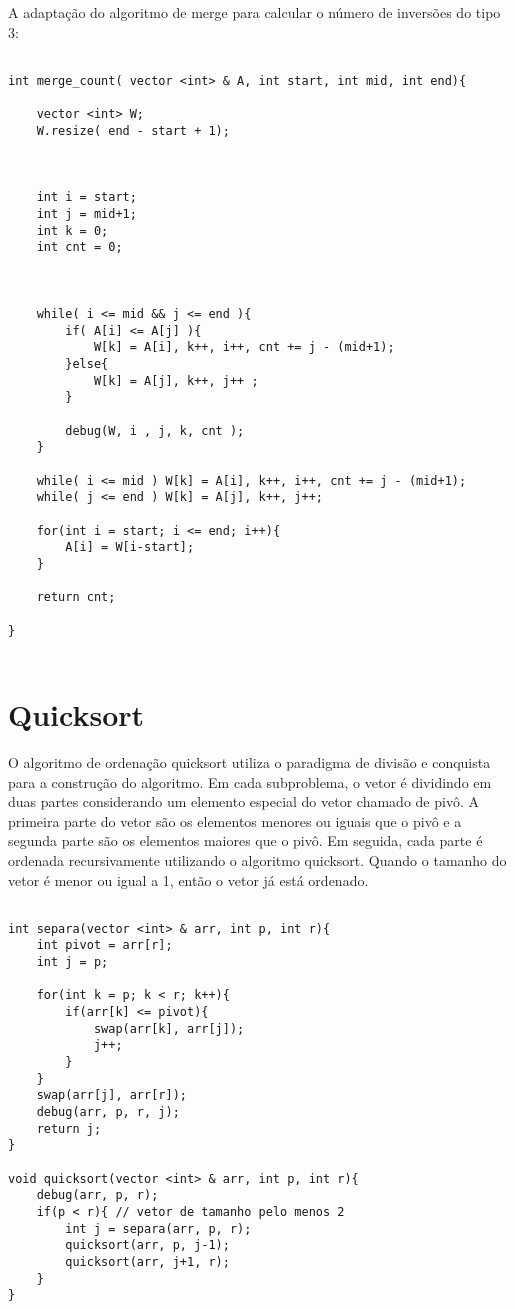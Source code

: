 A adaptação do algoritmo de merge para calcular o número de inversões do tipo 3:

\begin{verbatim}

int merge_count( vector <int> & A, int start, int mid, int end){

    vector <int> W;
    W.resize( end - start + 1);

   

    int i = start;
    int j = mid+1;
    int k = 0;
    int cnt = 0;

     

    while( i <= mid && j <= end ){
        if( A[i] <= A[j] ){
            W[k] = A[i], k++, i++, cnt += j - (mid+1);
        }else{
            W[k] = A[j], k++, j++ ;
        }

        debug(W, i , j, k, cnt );
    }

    while( i <= mid ) W[k] = A[i], k++, i++, cnt += j - (mid+1);
    while( j <= end ) W[k] = A[j], k++, j++;

    for(int i = start; i <= end; i++){
        A[i] = W[i-start];
    }

    return cnt;

}


\end{verbatim}






\section{Quicksort}

O algoritmo de ordenação quicksort utiliza o paradigma de divisão e conquista para a construção do algoritmo. Em cada subproblema, o vetor é dividindo em duas partes considerando um elemento especial do vetor chamado de pivô. A primeira parte do vetor são os elementos menores ou iguais que o pivô e a segunda parte são os elementos maiores que o pivô. Em seguida, cada parte é ordenada recursivamente utilizando o algoritmo quicksort. Quando o tamanho do vetor é menor ou igual a 1, então o vetor já está ordenado.

\begin{verbatim}

int separa(vector <int> & arr, int p, int r){
    int pivot = arr[r];
    int j = p;

    for(int k = p; k < r; k++){
        if(arr[k] <= pivot){
            swap(arr[k], arr[j]);
            j++;
        }
    }
    swap(arr[j], arr[r]);
    debug(arr, p, r, j);
    return j;
}

void quicksort(vector <int> & arr, int p, int r){
    debug(arr, p, r);
    if(p < r){ // vetor de tamanho pelo menos 2       
        int j = separa(arr, p, r);
        quicksort(arr, p, j-1); 
        quicksort(arr, j+1, r); 
    }   
}

\end{verbatim}

